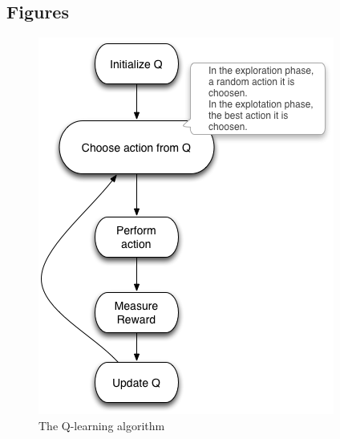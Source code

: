 \documentclass{bmcart}
\begin{document}
\begin{backmatter}
%




\section*{Figures}


\begin{figure}
\centering
\includegraphics{./images/qalgo.png}
\caption{The Q-learning algorithm}
\label{fig:qalgo}
\end{figure}



\end{backmatter}
\end{document}
